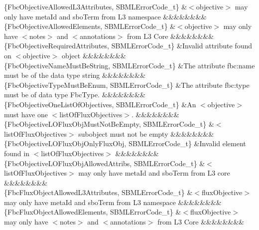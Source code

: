 \begin{DoxyParagraph}{}
\begin{longtabu}
\{Fbc\+Objective\+Allowed\+L3\+Attributes, S\+B\+M\+L\+Error\+Code\+\_\+t\} &{\ttfamily $<$objective$>$} may only have \textquotesingle{}meta\+Id\textquotesingle{} and \textquotesingle{}sbo\+Term\textquotesingle{} from L3 namespace &&&&&&&&\\
\{Fbc\+Objective\+Allowed\+Elements, S\+B\+M\+L\+Error\+Code\+\_\+t\} &{\ttfamily $<$objective$>$} may only have {\ttfamily $<$notes$>$} and {\ttfamily $<$annotations$>$} from L3 Core &&&&&&&&\\
\{Fbc\+Objective\+Required\+Attributes, S\+B\+M\+L\+Error\+Code\+\_\+t\} &Invalid attribute found on {\ttfamily $<$objective$>$} object &&&&&&&&\\
\{Fbc\+Objective\+Name\+Must\+Be\+String, S\+B\+M\+L\+Error\+Code\+\_\+t\} &The attribute \textquotesingle{}fbc\+:name\textquotesingle{} must be of the data type string &&&&&&&&\\
\{Fbc\+Objective\+Type\+Must\+Be\+Enum, S\+B\+M\+L\+Error\+Code\+\_\+t\} &The attribute \textquotesingle{}fbc\+:type\textquotesingle{} must be of data type Fbc\+Type. &&&&&&&&\\
\{Fbc\+Objective\+One\+List\+Of\+Objectives, S\+B\+M\+L\+Error\+Code\+\_\+t\} &An {\ttfamily $<$objective$>$} must have one {\ttfamily $<$list\+Of\+Flux\+Objectives$>$}. &&&&&&&&\\
\{Fbc\+Objective\+L\+O\+Flux\+Obj\+Must\+Not\+Be\+Empty, S\+B\+M\+L\+Error\+Code\+\_\+t\} &{\ttfamily $<$list\+Of\+Flux\+Objectives$>$} subobject must not be empty &&&&&&&&\\
\{Fbc\+Objective\+L\+O\+Flux\+Obj\+Only\+Flux\+Obj, S\+B\+M\+L\+Error\+Code\+\_\+t\} &Invalid element found in {\ttfamily $<$list\+Of\+Flux\+Objectives$>$} &&&&&&&&\\
\{Fbc\+Objective\+L\+O\+Flux\+Obj\+Allowed\+Attribs, S\+B\+M\+L\+Error\+Code\+\_\+t\} &{\ttfamily $<$list\+Of\+Flux\+Objectives$>$} may only have \textquotesingle{}meta\+Id\textquotesingle{} and \textquotesingle{}sbo\+Term\textquotesingle{} from L3 core &&&&&&&&\\
\{Fbc\+Flux\+Object\+Allowed\+L3\+Attributes, S\+B\+M\+L\+Error\+Code\+\_\+t\} &{\ttfamily $<$flux\+Objective$>$} may only have \textquotesingle{}meta\+Id\textquotesingle{} and \textquotesingle{}sbo\+Term\textquotesingle{} from L3 namespace &&&&&&&&\\
\{Fbc\+Flux\+Object\+Allowed\+Elements, S\+B\+M\+L\+Error\+Code\+\_\+t\} &{\ttfamily $<$flux\+Objective$>$} may only have {\ttfamily $<$notes$>$} and {\ttfamily $<$annotations$>$} from L3 Core &&&&&&&&\\

\end{longtabu}
\end{DoxyParagraph}
